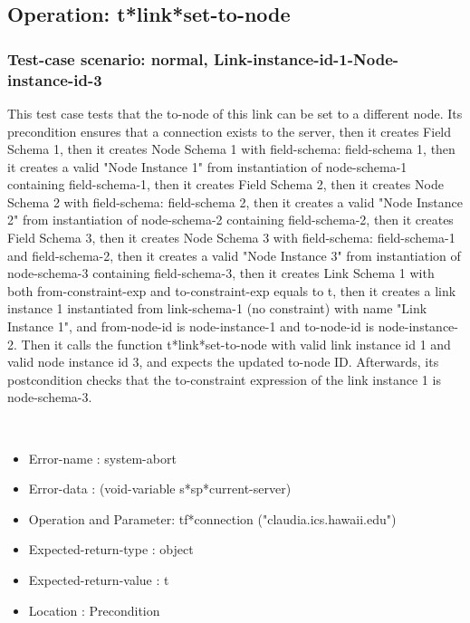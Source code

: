 \subsection {Operation: t*link*set-to-node}
\subsubsection {Test-case scenario: normal, Link-instance-id-1-Node-instance-id-3}


This test case tests that the to-node of this link can be set to a different node.
Its precondition ensures that a connection exists to the server, then it creates Field Schema 1, then it creates Node Schema 1 with field-schema: field-schema 1, then it creates a valid "Node Instance 1" from instantiation of node-schema-1 containing field-schema-1, then it creates Field Schema 2, then it creates Node Schema 2 with field-schema: field-schema 2, then it creates a valid "Node Instance 2" from instantiation of node-schema-2 containing field-schema-2, then it creates Field Schema 3, then it creates Node Schema 3 with field-schema: field-schema-1 and field-schema-2, then it creates a valid "Node Instance 3" from instantiation of node-schema-3 containing field-schema-3, then it creates Link Schema 1 with both from-constraint-exp and to-constraint-exp equals to t, then it creates a link instance 1 instantiated from  link-schema-1 (no constraint) with name "Link Instance 1", and from-node-id is node-instance-1 and to-node-id is node-instance-2.
Then it calls the function t*link*set-to-node  with  valid link instance id 1 and valid node instance id 3, and expects the updated to-node ID.
Afterwards, its postcondition checks that the to-constraint expression of the link instance 1 is node-schema-3.


\
\begin {itemize}
\item 	Error-name             : system-abort
\item Error-data             : (void-variable s*sp*current-server)
\item Operation and Parameter: tf*connection ("claudia.ics.hawaii.edu")
\item Expected-return-type   : object
\item Expected-return-value  : t
\item Location               : Precondition



\end {itemize}
